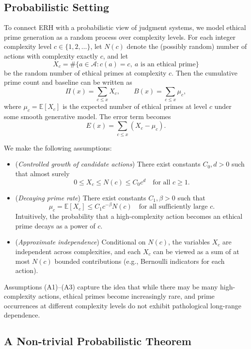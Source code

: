 \documentclass[12pt,a4paper]{article}
\theoremstyle{definition}
\theoremstyle{remark}
\begin{document}
\subsection{Probabilistic Setting}
\label{subsec:prob_setting}

To connect ERH with a probabilistic view of judgment systems, we model ethical prime generation as a random process over complexity levels.
For each integer complexity level $c \in \{1,2,\dots\}$, let $N(c)$ denote the (possibly random) number of actions with complexity exactly $c$, and let
\[
X_c = \#\{a \in \mathcal{A} : c(a)=c,\ a \text{ is an ethical prime}\}
\]
be the random number of ethical primes at complexity $c$.
Then the cumulative prime count and baseline can be written as
\[
\Pi(x) = \sum_{c \le x} X_c,
\qquad
B(x) = \sum_{c \le x} \mu_c,
\]
where $\mu_c = \mathbb{E}[X_c]$ is the expected number of ethical primes at level $c$ under some smooth generative model.
The error term becomes
\[
E(x) = \sum_{c \le x} (X_c - \mu_c).
\]

We make the following assumptions:
\begin{itemize}
    \item[(A1)] (\emph{Controlled growth of candidate actions}) There exist constants $C_0,d > 0$ such that almost surely
    \[
    0 \le X_c \le N(c) \le C_0 c^d
    \quad \text{for all } c \ge 1.
    \]
    \item[(A2)] (\emph{Decaying prime rate}) There exist constants $C_1,\beta > 0$ such that
    \[
    \mu_c = \mathbb{E}[X_c] \le C_1 c^{-\beta} N(c)
    \quad \text{for all sufficiently large } c.
    \]
    Intuitively, the probability that a high-complexity action becomes an ethical prime decays as a power of $c$.
    \item[(A3)] (\emph{Approximate independence}) Conditional on $N(c)$, the variables $X_c$ are independent across complexities, and each $X_c$ can be viewed as a sum of at most $N(c)$ bounded contributions (e.g., Bernoulli indicators for each action).
\end{itemize}

Assumptions (A1)--(A3) capture the idea that while there may be many high-complexity actions, ethical primes become increasingly rare, and prime occurrences at different complexity levels do not exhibit pathological long-range dependence.

\subsection{A Non-trivial Probabilistic Theorem}
\label{subsec:prob_theorem}
\end{document}
